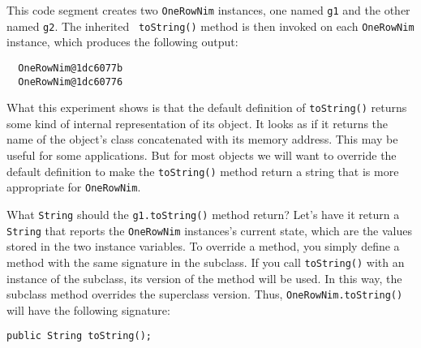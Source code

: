 \noindent This code segment creates two {\tt OneRowNim} instances, one
named {\tt g1} and the other named {\tt g2}. The inherited {\tt
toString()} method is then invoked on each {\tt OneRowNim} instance, which
produces the following output:

\begin{jjjlisting}
\begin{lstlisting}
  OneRowNim@1dc6077b
  OneRowNim@1dc60776
\end{lstlisting}
\end{jjjlisting}

\noindent What this experiment shows is that the default
definition of {\tt toString()} returns some kind of internal
representation of its object.  It looks as if it returns the name of the
object's class concatenated with its memory address.  This may be
useful for some applications.   But for most objects we will want to
override the default definition to make the {\tt toString()}
method return a string that is more appropriate for {\tt OneRowNim}.

What {\tt String} should the {\tt g1.toString()} method return?
Let's have it return a {\tt String} that reports the {\tt OneRowNim}
instances's current state, which are the values stored in the two
instance variables.  To override a method, you simply define a method
with the same signature in the subclass.  If you call {\tt toString()}
with an instance of the subclass, its version of the method will be
used. In this way, the subclass method overrides the superclass
version.  Thus, {\tt OneRowNim.toString()} will have the following
signature:

\begin{jjjlisting}
\begin{lstlisting}
public String toString();
\end{lstlisting}
\end{jjjlisting}


